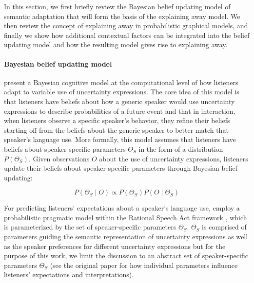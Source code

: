 \documentclass[man,floatsintext]{apa6}
\begin{document}
In this section, we first briefly review the Bayesian belief updating model of semantic adaptation that will form the basis of the explaining away model. We then review the concept of explaining away in probabilistic graphical models, and finally we show how additional contextual factors can be integrated into the belief updating model and how the resulting model gives rise to explaining away.

\paragraph{Bayesian belief updating model}  present a Bayesian cognitive model at the computational level \cite{Marr1982,Anderson1990} of how listeners adapt to variable use of uncertainty expressions. The core idea of this model is that listeners have beliefs about how a generic speaker would use uncertainty expressions to describe probabilities of a future event and that in interaction, when listeners observe a specific speaker's behavior, they refine their beliefs starting off from the beliefs about the generic speaker to better match that speaker's language use. More formally, this model assumes that listeners have beliefs about speaker-specific parameters $\Theta_S$ in the form of a distribution $P(\Theta_S)$. Given observations $O$ about the use of uncertainty expressions, listeners update their beliefs about speaker-specific parameters through Bayesian belief updating:

$$ P(\Theta_S \mid O) \propto P(\Theta_S) P(O \mid \Theta_S) $$

For predicting listeners' expectations about a speaker's language use,  employ a probabilistic pragmatic model within the Rational Speech Act framework \cite{Goodman2016}, which is parameterized by the set of speaker-specific parameters $\Theta_S$. $\Theta_S$ is comprised of parameters guiding the semantic representation of uncertainty expressions as well as the speaker preferences for different uncertainty expressions but for the purpose of this work, we limit the discussion to an abstract set of speaker-specific parameters $\Theta_S$ (see the original paper for how individual parameters influence listeners' expectations and interpretations).
\end{document}
